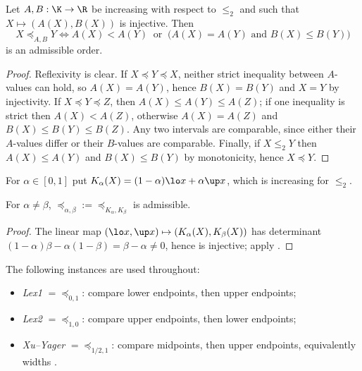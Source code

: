 \begin{theorem}\label{thm:bustince}
Let $A,B:\K\to\R$ be increasing with respect to $\le_2$ and such that $X\mapsto(A(X),B(X))$ is injective. Then
\[
X\preceq_{A,B}Y\iff A(X)<A(Y)\ \text{ or }\ \big(A(X)=A(Y)\text{ and }B(X)\le B(Y)\big)
\]
is an admissible order.
\end{theorem}

\begin{proof}
Reflexivity is clear. If $X\preceq Y\preceq X$, neither strict inequality between $A$-values can hold, so $A(X)=A(Y)$, hence $B(X)=B(Y)$ and $X=Y$ by injectivity. If $X\preceq Y\preceq Z$, then $A(X)\le A(Y)\le A(Z)$; if one inequality is strict then $A(X)<A(Z)$, otherwise $A(X)=A(Z)$ and $B(X)\le B(Y)\le B(Z)$. Any two intervals are comparable, since either their $A$-values differ or their $B$-values are comparable. Finally, if $X\le_2Y$ then $A(X)\le A(Y)$ and $B(X)\le B(Y)$ by monotonicity, hence $X\preceq Y$.
\end{proof}

For $\alpha\in[0,1]$ put $K_\alpha(X)=(1-\alpha)\lo x+\alpha\up x$, which is increasing for $\le_2$.

\begin{corollary}\label{cor:abdef}
For $\alpha\ne\beta$, $\preceq_{\alpha,\beta}:=\preceq_{K_\alpha,K_\beta}$ is admissible.
\end{corollary}

\begin{proof}
The linear map $(\lo x,\up x)\mapsto(K_\alpha(X),K_\beta(X))$ has determinant $(1-\alpha)\beta-\alpha(1-\beta)=\beta-\alpha\ne0$, hence is injective; apply .
\end{proof}

The following instances are used throughout:
\begin{itemize}
\item \emph{Lex1} $=\preceq_{0,1}$: compare lower endpoints, then upper endpoints;
\item \emph{Lex2} $=\preceq_{1,0}$: compare upper endpoints, then lower endpoints;
\item \emph{Xu--Yager} $=\preceq_{1/2,1}$: compare midpoints, then upper endpoints, equivalently widths \cite{xu2006}.
\end{itemize}

